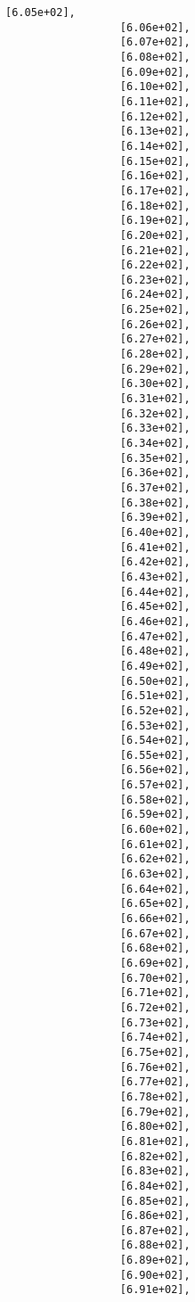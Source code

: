 \documentclass[11pt]{article}
\begin{document}
\begin{Verbatim}[commandchars=\\\{\}]
                  [6.05e+02],
                  [6.06e+02],
                  [6.07e+02],
                  [6.08e+02],
                  [6.09e+02],
                  [6.10e+02],
                  [6.11e+02],
                  [6.12e+02],
                  [6.13e+02],
                  [6.14e+02],
                  [6.15e+02],
                  [6.16e+02],
                  [6.17e+02],
                  [6.18e+02],
                  [6.19e+02],
                  [6.20e+02],
                  [6.21e+02],
                  [6.22e+02],
                  [6.23e+02],
                  [6.24e+02],
                  [6.25e+02],
                  [6.26e+02],
                  [6.27e+02],
                  [6.28e+02],
                  [6.29e+02],
                  [6.30e+02],
                  [6.31e+02],
                  [6.32e+02],
                  [6.33e+02],
                  [6.34e+02],
                  [6.35e+02],
                  [6.36e+02],
                  [6.37e+02],
                  [6.38e+02],
                  [6.39e+02],
                  [6.40e+02],
                  [6.41e+02],
                  [6.42e+02],
                  [6.43e+02],
                  [6.44e+02],
                  [6.45e+02],
                  [6.46e+02],
                  [6.47e+02],
                  [6.48e+02],
                  [6.49e+02],
                  [6.50e+02],
                  [6.51e+02],
                  [6.52e+02],
                  [6.53e+02],
                  [6.54e+02],
                  [6.55e+02],
                  [6.56e+02],
                  [6.57e+02],
                  [6.58e+02],
                  [6.59e+02],
                  [6.60e+02],
                  [6.61e+02],
                  [6.62e+02],
                  [6.63e+02],
                  [6.64e+02],
                  [6.65e+02],
                  [6.66e+02],
                  [6.67e+02],
                  [6.68e+02],
                  [6.69e+02],
                  [6.70e+02],
                  [6.71e+02],
                  [6.72e+02],
                  [6.73e+02],
                  [6.74e+02],
                  [6.75e+02],
                  [6.76e+02],
                  [6.77e+02],
                  [6.78e+02],
                  [6.79e+02],
                  [6.80e+02],
                  [6.81e+02],
                  [6.82e+02],
                  [6.83e+02],
                  [6.84e+02],
                  [6.85e+02],
                  [6.86e+02],
                  [6.87e+02],
                  [6.88e+02],
                  [6.89e+02],
                  [6.90e+02],
                  [6.91e+02],

\end{Verbatim}
\end{document}
